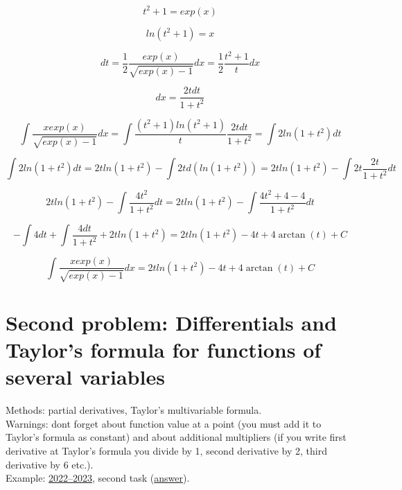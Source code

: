 \documentclass{article}
\begin{document}
\begin{equation}
    t^2+1 = exp(x)
\end{equation}

\begin{equation}
    ln(t^2+1) = x
\end{equation}

\begin{equation*}
    dt = \frac{1}{2} \frac{exp(x)}{\sqrt{exp(x)-1}}dx = \frac{1}{2} \frac{t^2+1}{t}dx
\end{equation*}

\begin{equation}
    dx = \frac{2tdt}{1+t^2}
\end{equation}

\begin{equation*}
    \int \frac{x exp(x)}{\sqrt{exp(x)-1}}dx = \int \frac{(t^2+1)ln(t^2+1)}{t} \frac{2tdt}{1+t^2} = \int 2ln(1+t^2)dt
\end{equation*}

\begin{equation*}
    \int 2ln(1+t^2)dt = 2tln(1+t^2) - \int 2t d(ln(1+t^2)) = 2tln(1+t^2) - \int 2t \frac{2t}{1+t^2}dt
\end{equation*}

\begin{equation*}
    2tln(1+t^2) - \int \frac{4t^2}{1+t^2}dt = 2tln(1+t^2) - \int \frac{4t^2+4-4}{1+t^2}dt
\end{equation*}

\begin{equation*}
    - \int 4dt + \int \frac{4dt}{1+t^2} + 2tln(1+t^2) = 2tln(1+t^2) - 4t + 4 \arctan (t) + C
\end{equation*}

\begin{equation}
    \int \frac{x exp(x)}{\sqrt{exp(x)-1}}dx = 2tln(1+t^2) - 4t + 4 \arctan (t) + C
\end{equation}


\newpage
\section{Second problem: Differentials and Taylor's formula for functions of several variables }
Methods: partial derivatives, Taylor's multivariable formula. \\
Warnings: dont forget about function value at a point (you must add it to Taylor's formula as constant) and about additional multipliers (if you write first derivative at Taylor's formula you divide by 1, second derivative by 2, third derivative by 6 etc.). \\
Example: \href{https://old.mipt.ru/education/chair/mathematics/exams/exams/2022-23/%D0%9C%D0%90%D0%98%D0%B8%D0%A0_%D0%92_23.pdf}{2022–2023}, second task (\href{https://old.mipt.ru/education/chair/mathematics/exams/exams/2022-23/%D0%9C%D0%90%D0%98%D0%B8%D0%A0_%D0%92_23%D0%BE%D1%82%D0%B2%D0%B5%D1%82%D1%8B.pdf}{answer}).
\end{document}

